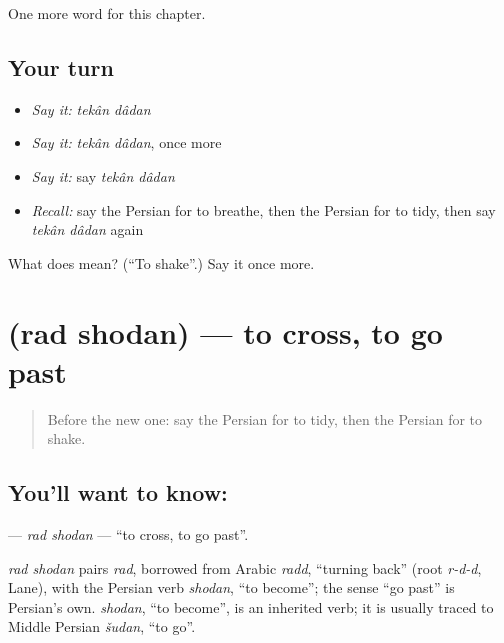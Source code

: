 \begin{grammarlens}[title={What you've built}]
One more word for this chapter.
\end{grammarlens}

\subsection*{Your turn}
\begin{itemize}
\raggedright
  \item \emph{Say it:} \emph{tekân dâdan}
  \item \emph{Say it:} \emph{tekân dâdan}, once more
  \item \emph{Say it:} say \emph{tekân dâdan}
  \item \emph{Recall:} say the Persian for to breathe, then the Persian for to tidy, then say \emph{tekân dâdan} again
\end{itemize}

\begin{tcolorbox}[breakable,colback=teal!4,colframe=teal!35!black,title={Before you move on}]
What does   mean? (\textquotedblleft{}To shake\textquotedblright{}.) Say it once more.
\end{tcolorbox}
\section[\texorpdfstring{\fa{رد} \fa{شدن} (rad shodan)}{رد شدن (rad shodan)}]{  (rad shodan) — to cross, to go past}

\label{lesson:FA-C181-rad-shodan}



\begin{quote}
Before the new one: say the Persian for to tidy, then the Persian for to shake.
\end{quote}

\subsection*{You'll want to know:  }
\textbf{ } — \emph{rad shodan} — \textquotedblleft{}to cross, to go past\textquotedblright{}.

\begin{cousinweb}
\emph{rad shodan} pairs \emph{rad}, borrowed from Arabic \emph{radd}, \textquotedblleft{}turning back\textquotedblright{} (root \emph{r-d-d}, Lane), with the Persian verb \emph{shodan}, \textquotedblleft{}to become\textquotedblright{}; the sense \textquotedblleft{}go past\textquotedblright{} is Persian's own. \emph{shodan}, \textquotedblleft{}to become\textquotedblright{}, is an inherited verb; it is usually traced to Middle Persian \emph{šudan}, \textquotedblleft{}to go\textquotedblright{}.
\end{cousinweb}

